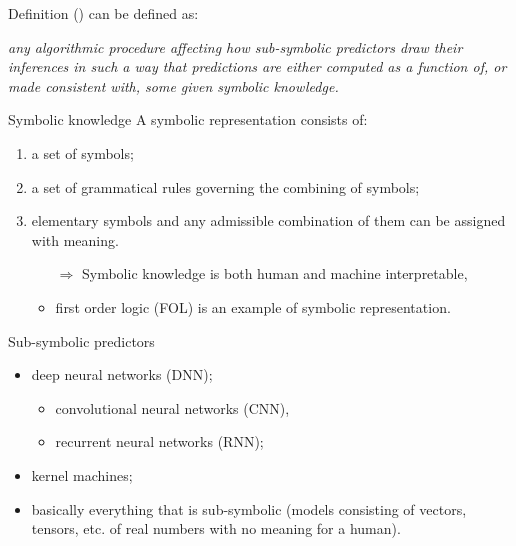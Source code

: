 \documentclass[presentation]{beamer}\mode<presentation>{\usetheme{AMSBolognaFC}}
\begin{document}
\begin{frame}[allowframebreaks]{\skilong}
    
    \begin{block}{Definition }
        \skilong{} (\skishort) can be defined as:
        \begin{displayquote}\itshape
            any \emph{algorithmic} procedure affecting how \alert{sub-symbolic predictors} draw their inferences in such a way that predictions are either \emph{computed} as a function of, or made \emph{consistent} with, some \emph{given} \alert{symbolic knowledge}.
        \end{displayquote}
    \end{block}
    
    \framebreak
    
    \begin{block}{Symbolic knowledge}
        A symbolic representation consists of: 
        \begin{enumerate}
            \item a set of symbols;
            \item\label{item:symbolic-combination} a set of grammatical rules governing the combining of symbols; 
            \item\label{item:symbolic-assignment} elementary symbols and any admissible combination of them can be assigned with meaning.
            \begin{itemize}
                \item[$\Rightarrow$] Symbolic knowledge is both human and machine interpretable,
                \item first order logic (FOL) is an example of symbolic representation.
            \end{itemize}
        \end{enumerate}
    \end{block}
    
    \framebreak
    
    \begin{block}{Sub-symbolic predictors}
        \begin{itemize}
            \item deep neural networks (DNN);
            \begin{itemize}
                \item convolutional neural networks (CNN),
                \item recurrent neural networks (RNN);
            \end{itemize}
            \item kernel machines;
            \item basically everything that is sub-symbolic (models consisting of vectors, tensors, etc. of real numbers with no meaning for a human).
        \end{itemize}
    \end{block}
    

\end{frame}
\end{document}
